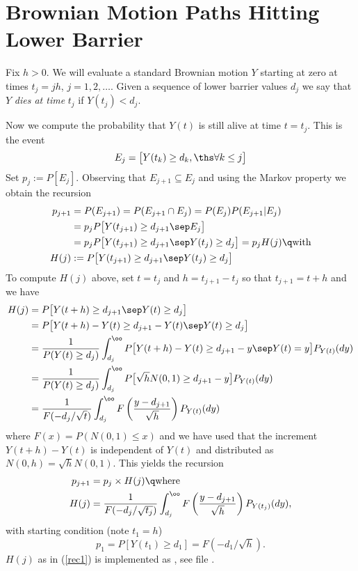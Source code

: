 \section{Brownian Motion Paths Hitting Lower Barrier}

Fix $h>0$. We will evaluate a standard Brownian motion $Y$ starting at zero at 
times $t_j=jh$, $j=1,2,\dots$. Given a sequence of lower barrier values $d_j$ 
we say that $Y$ \textit{dies at time} $t_j$ if $Y(t_j)<d_j$.

Now we compute the probability that $Y(t)$ is still alive at time $t=t_j$. 
This is the event
$$
E_j=\big[Y(t_k)\geq d_k,\ths\forall k\leq j\big]
$$
Set $p_j:=P[E_j]$. Observing that $E_{j+1}\subseteq E_j$ and using the Markov property we obtain the recursion
%
\begin{align*}
p_{j+1} &= P(E_{j+1})=P(E_{j+1}\cap E_j)=P(E_j)P(E_{j+1}|E_j)\\&=
p_jP\big[Y(t_{j+1})\geq d_{j+1}\sep E_j\big]\\&=
p_jP\big[Y(t_{j+1})\geq d_{j+1}\sep Y(t_j)\geq d_j\big] = p_jH(j)
\q\text{with}\\
H(j) &:= P\big[Y(t_{j+1})\geq d_{j+1}\sep Y(t_j)\geq d_j\big]
\end{align*}
% 
To compute $H(j)$ above, set $t=t_j$ and $h=t_{j+1}-t_j$ so that
$t_{j+1}=t+h$ and we have
%
\begin{align*}
H(j) &=
P\big[Y(t+h)\geq d_{j+1}\sep Y(t)\geq d_j\big] \\&=
P\big[Y(t+h)-Y(t)\geq d_{j+1}-Y(t)\sep Y(t)\geq d_j\big] 
\\&=
\frac{1}{P(Y(t)\geq d_j)}
\int_{d_j}^\oo P\big[Y(t+h)-Y(t)\geq d_{j+1}-y\sep Y(t)=y\big]P_{Y(t)}(dy) 
\\&=
\frac{1}{P(Y(t)\geq d_j)}
\int_{d_j}^\oo P\big[\sqrt hN(0,1)\geq d_{j+1}-y\big]P_{Y(t)}(dy) 
\\&=
\frac{1}{F(-d_j/\sqrt{t})}
\int_{d_j}^\oo F\left(\frac{y-d_{j+1}}{\sqrt h}\right)P_{Y(t)}(dy)
\end{align*}
%
where $F(x)=P(N(0,1)\leq x)$ and we have used that the increment $Y(t+h)-Y(t)$ 
is independent of $Y(t)$ and distributed as $N(0,h)=\sqrt h N(0,1)$.
This yields the recursion
%
\begin{align}
\label{rec0}
p_{j+1} &= p_j\times H(j)\q\text{where}\\\label{rec1}
H(j) &= \frac{1}{F(-d_j/\sqrt{t_j})}
\int_{d_j}^\oo F\left(\frac{y-d_{j+1}}{\sqrt h}\right)P_{Y(t_j)}(dy),
\end{align}
%
with starting condition (note $t_1=h$)
%
\begin{equation}
\label{rec2}
p_1=P[Y(t_1)\geq d_1]=F(-d_1/\sqrt h).
\end{equation}
%
$H(j)$ as in (\ref{rec1}) is implemented as , see file
.

